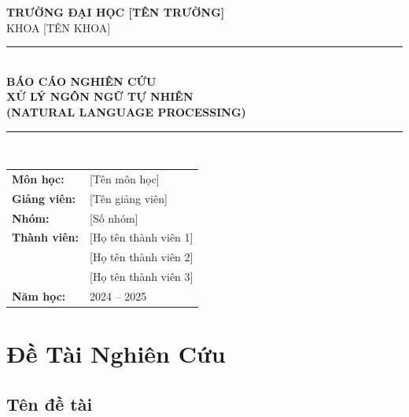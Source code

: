 \documentclass[12pt, a4paper]{article}
\begin{document}
\begin{titlepage}
    \centering
    \vspace*{1cm}

    {\Large\bfseries TRƯỜNG ĐẠI HỌC [TÊN TRƯỜNG]}\\[0.3cm]
    {\large KHOA [TÊN KHOA]}\\[2cm]

    \rule{\linewidth}{1.5pt}\\[0.4cm]
    {\LARGE\bfseries\color{primaryblue}
        BÁO CÁO NGHIÊN CỨU\\[0.3cm]
        XỬ LÝ NGÔN NGỮ TỰ NHIÊN\\
        (NATURAL LANGUAGE PROCESSING)
    }\\[0.4cm]
    \rule{\linewidth}{1.5pt}\\[2cm]

    \begin{tabular}{ll}
        \textbf{Môn học:}       & [Tên môn học] \\[0.3cm]
        \textbf{Giảng viên:}    & [Tên giảng viên] \\[0.3cm]
        \textbf{Nhóm:}          & [Số nhóm] \\[0.3cm]
        \textbf{Thành viên:}    & [Họ tên thành viên 1] \\
                                & [Họ tên thành viên 2] \\
                                & [Họ tên thành viên 3] \\[0.3cm]
        \textbf{Năm học:}       & 2024 -- 2025 \\
    \end{tabular}

    \vfill
    {\large\the\year}
\end{titlepage}

\tableofcontents
\newpage

\section{Đề Tài Nghiên Cứu}

\subsection{Tên đề tài}
\end{document}
